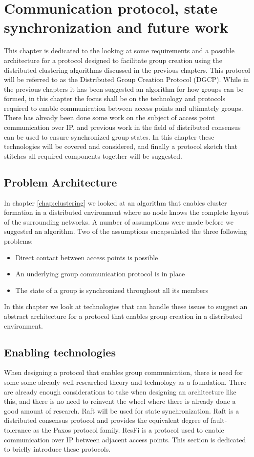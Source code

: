 \chapter{Communication protocol, state synchronization and future work}
\label{chap:proto}
This chapter is dedicated to the looking at some requirements and a possible architecture for a protocol designed to facilitate group creation using the
distributed clustering algorithms discussed in the previous chapters. This protocol will be referred to as the Distributed Group Creation Protocol (DGCP).
While in the previous chapters it has been suggested an algorithm for how groups can be formed, in this chapter the focus shall be on the technology and protocols required
to enable communication between access points and ultimately groups. There has already been done some work on the subject of access point communication over IP,
and previous work in the field of distributed consensus can be used to ensure synchronized group states. In this chapter these technologies will be covered and considered,
and finally a protocol sketch that stitches all required components together will be suggested. 


\section{Problem Architecture}
In chapter \ref{chap:clustering} we looked at an algorithm that enables cluster formation in a distributed environment where no node knows the complete layout of the surrounding networks.
A number of assumptions were made before we suggested an algorithm. Two of the assumptions encapsulated the three following problems:
\begin{itemize}
\item Direct contact between access points is possible
\item An underlying group communication protocol is in place
\item The state of a group is synchronized throughout all its members
\end{itemize}
In this chapter we look at technologies that can handle these issues to suggest an abstract architecture for a protocol that enables group creation in a distributed environment.

\section{Enabling technologies}
When designing a protocol that enables group communication, there is need for some some already well-researched theory and technology as a foundation. There are already enough
considerations to take when designing an architecture like this, and there is no need to reinvent the wheel where there is already done a good amount of research. 
Raft will be used for state synchronization. Raft is a distributed consensus protocol and provides the equivalent degree of fault-tolerance as the Paxos \cite{lamport2001paxos} protocol family.
ResFi is a protocol used to enable communication over IP between adjacent access points. This section is dedicated to briefly introduce these protocols. 

